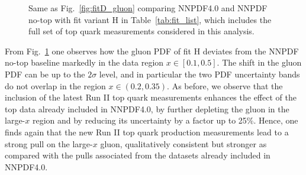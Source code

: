 \documentclass[withindex,glossary]{cam-thesis}
\begin{document}
\begin{figure}[t]
\centering
        \caption{ Same as Fig.~\ref{fig:fitD_gluon} comparing NNPDF4.0
          and NNPDF no-top with fit variant H in Table~\ref{tab:fit_list},
          which includes the full set of top quark measurements considered in this analysis.}
\label{fig:fitH_gluon}
\end{figure}

From Fig.~\ref{fig:fitH_gluon} one observes
how the gluon PDF of fit H deviates from the NNPDF no-top baseline
markedly in the data region $x \in [0.1, 0.5]$.
%
The shift in the gluon PDF can be up to the $2\sigma$ level, and
in particular the two PDF uncertainty bands do not overlap
in the region $x\in \left( 0.2, 0.35\right) $.
%
As before, we  observe that the inclusion of
the latest Run II top quark measurements enhances the effect of the top
data already
included in NNPDF4.0, by further depleting the gluon in the large-$x$ region
 and  by reducing its uncertainty by a factor up to 25\%.
%
 Hence, one finds again that the new Run II top quark production
 measurements lead to
 a strong pull on the large-$x$ gluon, qualitatively
 consistent but stronger as compared
 with the pulls associated from the datasets already included in NNPDF4.0.
\end{document}

